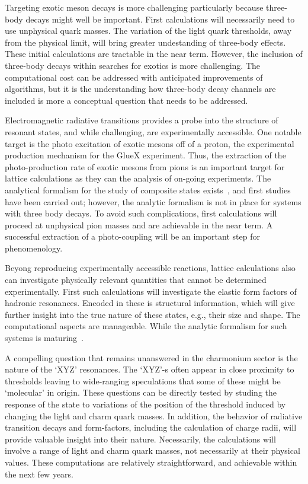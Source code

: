 Targeting exotic meson decays is more challenging particularly because three-body decays might well be important. First calculations will necessarily need to use unphysical quark masses. The variation of the light quark thresholds, away from the physical limit, will bring greater undestanding of three-body effects. These initial calculations are tractable in the near term. However, the inclusion of three-body decays within searches for exotics is more challenging. The computational cost can be addressed with anticipated improvements of algorithms, but it is the understanding how three-body decay channels are included is more a conceptual question that needs to be addressed.


Electromagnetic radiative transitions provides a probe into the structure of resonant states, and while challenging, are experimentally accessible. 
One notable target is the photo excitation of exotic mesons off of a proton, the experimental production mechanism for the GlueX experiment. Thus, the extraction of the photo-production rate of exotic mesons from pions is an important target for lattice calculations as they can the analysis of on-going experiments. The analytical formalism for the study of composite states exists~\cite{Briceno:2015tza}, and first studies have been carried out; however, the analytic formalism is not in place for systems with three body decays. To avoid such complications, first calculations will proceed at unphysical pion masses and are achievable in the near term. A successful extraction of a photo-coupling will be an important step for phenomenology.

Beyong reproducing experimentally accessible reactions, lattice calculations also can investigate physically relevant quantities that cannot be determined experimentally. First such calculations will investigate the elastic form factors of hadronic resonances. Encoded in these is structural information, which will give further insight into the true nature of these states, e.g., their size and shape. The computational aspects are manageable. While the analytic formalism for such systems is maturing~\cite{Briceno:2015tza,Baroni:2018unx}.


A compelling question that remains unanswered in the charmonium sector is the nature of the `XYZ' resonances. The `XYZ'-s often appear in close proximity to thresholds leaving to wide-ranging speculations that some of these might be `molecular' in origin. These questions can be directly tested by studing the response of the state to variations of the position of the threshold induced by changing the light and charm quark masses. In addition, the behavior of radiative transition decays and form-factors, including the calculation of charge radii, will provide valuable insight into their nature. Necessarily, the calculations will involve a range of light and charm quark masses, not necessarily at their physical values.  These computations are relatively straightforward, and achievable within the next few years. 


